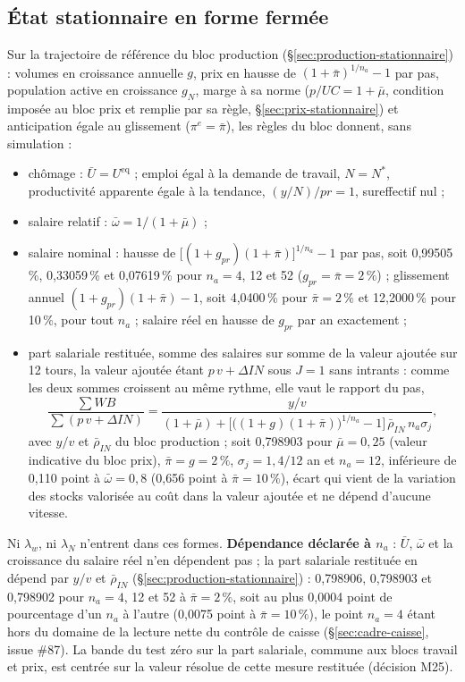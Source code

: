 \documentclass[11pt,a4paper]{article}
\begin{document}
\subsection{État stationnaire en forme fermée}
\label{sec:travail-stationnaire}
Sur la trajectoire de référence du bloc production (\S\ref{sec:production-stationnaire}) : volumes en croissance annuelle $g$, prix en hausse de $(1 + \bar\pi)^{1/n_a} - 1$ par pas, population active en croissance $g_N$, marge à sa norme ($p/\mathit{UC} = 1 + \bar\mu$, condition imposée au bloc prix et remplie par sa règle, \S\ref{sec:prix-stationnaire}) et anticipation égale au glissement ($\pi^e = \bar\pi$), les règles du bloc donnent, sans simulation :
\begin{itemize}
\item chômage : $\bar U = U^{\mathrm{eq}}$ ; emploi égal à la demande de travail, $N = N^{\ast}$, productivité apparente égale à la tendance, $(y/N)/\mathit{pr} = 1$, sureffectif nul ;
\item salaire relatif : $\bar\omega = 1/(1 + \bar\mu)$ ;
\item salaire nominal : hausse de $\bigl[(1 + g_{\mathit{pr}})(1 + \bar\pi)\bigr]^{1/n_a} - 1$ par pas, soit 0,99505\,\%, 0,33059\,\% et 0,07619\,\% pour $n_a = 4$, 12 et 52 ($g_{\mathit{pr}} = \bar\pi = 2\,\%$) ; glissement annuel $(1 + g_{\mathit{pr}})(1 + \bar\pi) - 1$, soit 4,0400\,\% pour $\bar\pi = 2\,\%$ et 12,2000\,\% pour 10\,\%, pour tout $n_a$ ; salaire réel en hausse de $g_{\mathit{pr}}$ par an exactement ;
\item part salariale restituée, somme des salaires sur somme de la valeur ajoutée sur 12 tours, la valeur ajoutée étant $p\,v + \Delta\mathit{IN}$ sous $J = 1$ sans intrants : comme les deux sommes croissent au même rythme, elle vaut le rapport du pas,
\begin{equation*}
\frac{\sum \mathit{WB}}{\sum (p\,v + \Delta\mathit{IN})} = \frac{y/v}{(1 + \bar\mu) + \bigl[\bigl((1 + g)(1 + \bar\pi)\bigr)^{1/n_a} - 1\bigr]\,\bar\rho_{\mathit{IN}}\, n_a\sigma_j} ,
\end{equation*}
avec $y/v$ et $\bar\rho_{\mathit{IN}}$ du bloc production ; soit 0,798903 pour $\bar\mu = 0{,}25$ (valeur indicative du bloc prix), $\bar\pi = g = 2\,\%$, $\sigma_j = 1{,}4/12$ an et $n_a = 12$, inférieure de 0,110 point à $\bar\omega = 0{,}8$ (0,656 point à $\bar\pi = 10\,\%$), écart qui vient de la variation des stocks valorisée au coût dans la valeur ajoutée et ne dépend d'aucune vitesse.
\end{itemize}
Ni $\lambda_w$, ni $\lambda_N$ n'entrent dans ces formes. \textbf{Dépendance déclarée à $n_a$} : $\bar U$, $\bar\omega$ et la croissance du salaire réel n'en dépendent pas ; la part salariale restituée en dépend par $y/v$ et $\bar\rho_{\mathit{IN}}$ (\S\ref{sec:production-stationnaire}) : 0,798906, 0,798903 et 0,798902 pour $n_a = 4$, 12 et 52 à $\bar\pi = 2\,\%$, soit au plus 0,0004 point de pourcentage d'un $n_a$ à l'autre (0,0075 point à $\bar\pi = 10\,\%$), le point $n_a = 4$ étant hors du domaine de la lecture nette du contrôle de caisse (\S\ref{sec:cadre-caisse}, issue \#87). La bande du test zéro sur la part salariale, commune aux blocs travail et prix, est centrée sur la valeur résolue de cette mesure restituée (décision M25).
\end{document}
